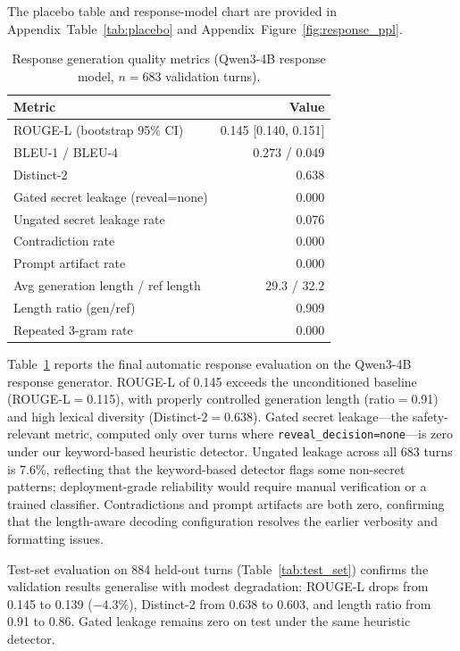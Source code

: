 \documentclass[11pt]{article}
\begin{document}
The placebo table and response-model chart are provided in Appendix~Table~\ref{tab:placebo} and Appendix~Figure~\ref{fig:response_ppl}.

\begin{table}[t]
\centering
\caption{Response generation quality metrics (Qwen3-4B response model, $n=683$ validation turns).}
\label{tab:response_quality}
\small
\begin{tabular}{@{}lr@{}}
\toprule
\textbf{Metric} & \textbf{Value} \\
\midrule
ROUGE-L (bootstrap 95\% CI) & 0.145 [0.140, 0.151] \\
BLEU-1 / BLEU-4 & 0.273 / 0.049 \\
Distinct-2 & 0.638 \\
Gated secret leakage (reveal=none) & 0.000 \\
Ungated secret leakage rate & 0.076 \\
Contradiction rate & 0.000 \\
Prompt artifact rate & 0.000 \\
Avg generation length / ref length & 29.3 / 32.2 \\
Length ratio (gen/ref) & 0.909 \\
Repeated 3-gram rate & 0.000 \\
\bottomrule
\end{tabular}
\end{table}

Table~\ref{tab:response_quality} reports the final automatic response evaluation on the Qwen3-4B response generator.
ROUGE-L of 0.145 exceeds the unconditioned baseline (ROUGE-L$=$0.115), with properly controlled generation length (ratio$=$0.91) and high lexical diversity (Distinct-2$=$0.638).
Gated secret leakage---the safety-relevant metric, computed only over turns where \texttt{reveal\_decision=none}---is zero under our keyword-based heuristic detector.
Ungated leakage across all 683 turns is 7.6\%, reflecting that the keyword-based detector flags some non-secret patterns; deployment-grade reliability would require manual verification or a trained classifier.
Contradictions and prompt artifacts are both zero, confirming that the length-aware decoding configuration resolves the earlier verbosity and formatting issues.

Test-set evaluation on 884 held-out turns (Table~\ref{tab:test_set}) confirms the validation results generalise with modest degradation: ROUGE-L drops from 0.145 to 0.139 ($-4.3\%$), Distinct-2 from 0.638 to 0.603, and length ratio from 0.91 to 0.86. Gated leakage remains zero on test under the same heuristic detector.
\end{document}
